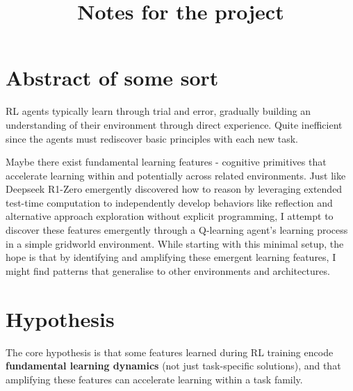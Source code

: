 \documentclass{article}
\begin{document}
\title{Notes for the project}
\author{}
\date{}
\maketitle


\section{Abstract of some sort}

RL agents typically learn through trial and error, gradually building an understanding of their environment through direct experience. Quite inefficient since the agents must rediscover basic principles with each new task. 

Maybe there exist fundamental learning features - cognitive primitives that accelerate learning within and potentially across related environments.
Just like Deepseek R1-Zero emergently discovered how to reason by leveraging extended test-time computation to independently develop behaviors like reflection and alternative approach exploration without explicit programming, I attempt to discover these features emergently through a Q-learning agent's learning process in a simple gridworld environment. While starting with this minimal setup, the hope is that by identifying and amplifying these emergent learning features, I might find patterns that generalise to other environments and architectures.


\section{Hypothesis}
The core hypothesis is that some features learned during RL training encode \textbf{fundamental learning dynamics} (not just task-specific solutions), and that amplifying these features can accelerate learning within a task family.
\end{document}
